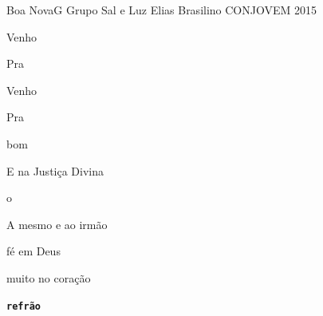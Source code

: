 \documentclass[a4,12pt,oneside]{book}
\newcommand{\RevDate}{\today}
\newcommand{\NotCCLIed}{\relax}
\begin{document}
\begin{song}{Boa Nova}{G}
  {Grupo Sal e Luz}
  {Elias Brasilino}
  {CONJOVEM 2015}
  {\NotCCLIed}
  
	\renewcommand{\RevDate}{15 de abril de 2015}
  
	
	\ifChordBk
		{\vspace{-1em}\flushright{\Gchord \quad \Bmchord \quad \Bmschord \quad \Cchord \quad \Dchord \quad \Emchord
		\quad \Amchord\\}}
	\fi
	
    \begin{SBChorus}
		\ifChordBk
			\vspace{-1cm}
		\fi
		
		 Venho 
		
		Pra   
		
		 Venho 
				
		Pra    
    \end{SBChorus}

	\ifChordBk
	\begin{flushright}
		\begin{minipage}{0.50\columnwidth}
	\fi
			\begin{SBVerse}
				\ifChordBk
					\vspace{-2.5cm}
				\fi

				 bom 
				
				{\normalsize E  na Justiça Divina}
				
				 o  
				
				A  mesmo e ao irmão
				
				 fé em Deus 
				
				muito  no coração 
			
				\texttt{\textbf{refrão}}
		    \end{SBVerse}
	\ifChordBk
		\end{minipage}
	\end{flushright}
	\fi
	
	\ifChordBk
	\begin{flushleft}
		\begin{minipage}{0.50\columnwidth}
	\fi
			\begin{SBVerse}
				\ifChordBk
					\vspace{-5.5cm}
				\fi
			

\end{SBVerse}
\end{minipage}
\end{flushleft}
\end{song}
\end{document}
